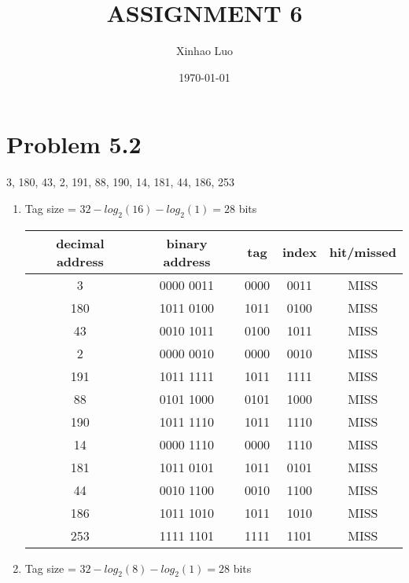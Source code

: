 \documentclass{article}
\title{\bf \Large ASSIGNMENT 6}
\author{Xinhao Luo}
\date{\today}
\def\math#1{$#1$}
\begin{document}
\maketitle
\medskip

\section{Problem 5.2}
3, 180, 43, 2, 191, 88, 190, 14, 181, 44, 186, 253
\begin{enumerate}[1)]
    \item Tag size = \math{32 - log_2(16) - log_2(1) = 28} bits
        \begin{center}
            \begin{tabular}{ |c|c|c|c|c| }
             \hline
             decimal address & binary address & tag & index & hit/missed \\
             \hline
             3 & 0000 0011 & 0000 & 0011 & MISS \\  
             \hline
             180 & 1011 0100 & 1011 & 0100 & MISS \\
             \hline
             43 & 0010 1011 & 0100 & 1011 & MISS \\
             \hline
             2 & 0000 0010 & 0000 & 0010 & MISS\\
             \hline
             191 & 1011 1111 & 1011 & 1111 & MISS\\
             \hline
             88 & 0101 1000 & 0101 & 1000 & MISS \\
             \hline
             190 & 1011 1110 & 1011 & 1110 & MISS \\
             \hline
             14 & 0000 1110 & 0000 & 1110 & MISS \\
             \hline
             181 & 1011 0101 & 1011 & 0101 & MISS \\
             \hline
             44 & 0010 1100 & 0010 & 1100 & MISS \\
             \hline
             186 & 1011 1010 & 1011 & 1010 & MISS \\
             \hline
             253 & 1111 1101 & 1111 & 1101 & MISS \\
             \hline
            \end{tabular}
        \end{center}
    \item Tag size = \math{32 - log_2(8) - log_2(1) = 28} bits
        \begin{center}
            \begin{tabular}{ |c|c|c|c|c|c| }

\end{tabular}
\end{center}
\end{enumerate}
\end{document}
